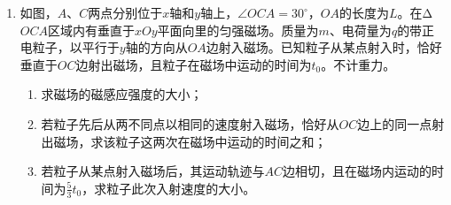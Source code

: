 \begin{enumerate}[leftmargin=0em]
\newpage
\item
{}
如图，$ A $、$ C $两点分别位于$ x $轴和$ y $轴上，$ \angle OCA=30 ^{ \circ } $，$ OA $的长度为$ L $。在Δ$ OCA $区域内有垂直于$ xOy $平面向里的匀强磁场。质量为$ m $、电荷量为$ q $的带正电粒子，以平行于$ y $轴的方向从$ OA $边射入磁场。已知粒子从某点射入时，恰好垂直于$ OC $边射出磁场，且粒子在磁场中运动的时间为$ t_{0} $。不计重力。
\begin{enumerate}
\renewcommand{\labelenumi}{\arabic{enumi}.}
\item
求磁场的磁感应强度的大小；
\item 
若粒子先后从两不同点以相同的速度射入磁场，恰好从$ OC $边上的同一点射出磁场，求该粒子这两次在磁场中运动的时间之和；
\item 
若粒子从某点射入磁场后，其运动轨迹与$ AC $边相切，且在磁场内运动的时间为$ \frac{ 5 }{ 3 } t_{0} $，求粒子此次入射速度的大小。



\end{enumerate}
\begin{figure}[h!]
\flushright

\end{figure}








\end{enumerate}
